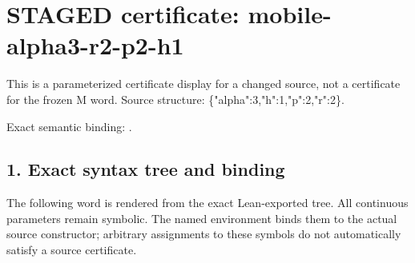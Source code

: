 \section*{STAGED certificate: mobile-alpha3-r2-p2-h1}
This is a parameterized certificate display for a changed source, not a certificate for the frozen M word.
Source structure: \{"alpha":3,"h":1,"p":2,"r":2\}.

\noindent Exact semantic binding: .

\subsection*{1. Exact syntax tree and binding}
The following word is rendered from the exact Lean-exported tree. All continuous parameters remain symbolic. The named environment binds them to the actual source constructor; arbitrary assignments to these symbols do not automatically satisfy a source certificate.


